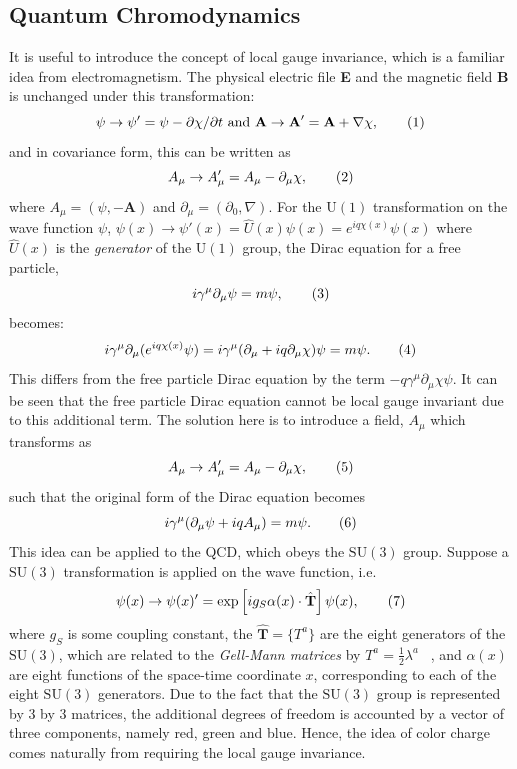 \subsection{Quantum Chromodynamics}
\label{sec:SM:QCD}
It is useful to introduce the concept of
local gauge invariance, which is a familiar idea from electromagnetism.
The physical electric file \textbf{E} and the magnetic field \textbf{B} is unchanged under
this transformation:
\[
    \psi \rightarrow \psi ' = \psi - \partial \chi / \partial t  \ \text{and}\  \textbf{A} \rightarrow \textbf{A}' = \textbf{A} + \nabla \chi  ,\addtag \]
and in covariance form, this can be written as
\[
    A_\mu \rightarrow A_\mu' = A_\mu - \partial_\mu \chi, \addtag \]
where $A_\mu = (\psi, -\textbf{A})$ and $\partial_\mu = (\partial_0,\nabla )$.
For the $\text{U}(1)$ transformation on the wave function $\psi$,
$\psi(x) \rightarrow \psi'(x) = \hat{U}(x)\psi(x) = e^{iq\chi(x)} \psi(x)$ where 
$\hat{U}(x)$ is the \textit{generator} of the $\text{U}(1)$ group, 
the Dirac equation for a free particle, 
\[
    i \gamma^\mu \partial_\mu \psi = m \psi, \addtag \]
becomes: 
\[
i\gamma^\mu \partial_\mu (e^{iq\chi(x)} \psi)  = i \gamma^\mu (\partial_\mu + iq\partial_\mu\chi) \psi = m\psi .
\addtag \]
This differs from the free particle Dirac equation by the term $-q\gamma^\mu\partial_\mu\chi \psi$. 
It can be seen that the free particle Dirac equation cannot be local gauge invariant due to this 
additional term. 
The solution here is to introduce a field, $A_\mu$ which transforms as 
\[
    A_\mu \rightarrow A_\mu' = A_\mu - \partial_\mu \chi , \addtag \]
such that the original form of the Dirac equation becomes 
\[
    i \gamma^\mu (\partial_\mu \psi + iq A_\mu ) = m \psi .\addtag \]
This idea can be applied to the QCD, which obeys the $\text{SU}(3)$ group. 
Suppose a $\text{SU}(3)$ transformation is applied on the wave function, i.e.\ 
\[
    \psi(x) \rightarrow \psi(x) ' = \text{exp}\left[  ig_S \alpha(x)\cdot \hat{\textbf{T}} \right] \psi(x),\addtag \]
where $g_S$ is some coupling constant, the $\hat{\textbf{T}} = \{T^a\}$ are the eight generators of the $\text{SU}(3)$,
which are related to the \textit{Gell-Mann matrices} by $T^a = \frac{1}{2} \lambda^a$ ~\cite{Gell-Mann}, 
and $\alpha(x)$ are eight functions of the space-time coordinate $x$, 
corresponding to each of the eight $\text{SU}(3)$ generators.
Due to the fact that the $\text{SU}(3)$ group is represented by 3 by 3 matrices, the additional 
degrees of freedom is accounted by a vector of three components, namely red, green and blue. 
Hence, the idea of color charge comes naturally from requiring the local gauge invariance. 
